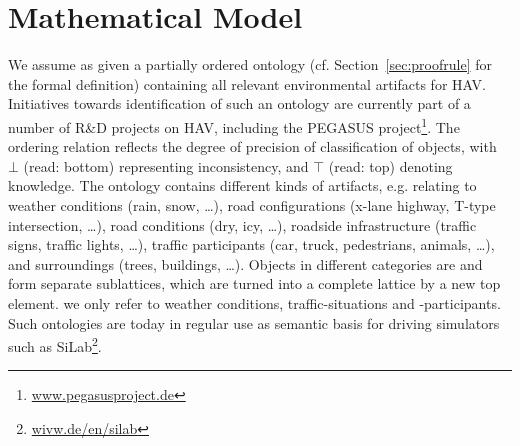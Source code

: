 \section{Mathematical Model}\label{sec:mathmodel}
We assume as given a partially ordered ontology (cf. Section~\ref{sec:proofrule} for the formal definition) containing all relevant environmental artifacts for HAV. Initiatives towards identification of such an ontology are currently part of a number of R\&D projects on HAV, including the PEGASUS project\footnote{\url{www.pegasusproject.de}}. The ordering relation reflects the degree of precision of classification of objects, with $\bot$ (read: bottom) representing inconsistency, and $\top$ (read: top) denoting  knowledge. The ontology contains different kinds of artifacts, e.g. relating to weather conditions (rain, snow, \ldots), road configurations (x-lane highway, T-type  intersection, \ldots), road conditions (dry, icy,  \ldots), roadside infrastructure (traffic signs, traffic lights, \ldots), traffic participants (car, truck, pedestrians,  animals,  \ldots), and surroundings  (trees, buildings, \ldots). Objects in different categories are  and form separate sublattices, which are turned into a complete lattice by  a new top element.  we  only refer to weather conditions, traffic-situations and -participants. Such ontologies are today in regular use as semantic basis for driving simulators such as SiLab\footnote{\url{wivw.de/en/silab}}. 

